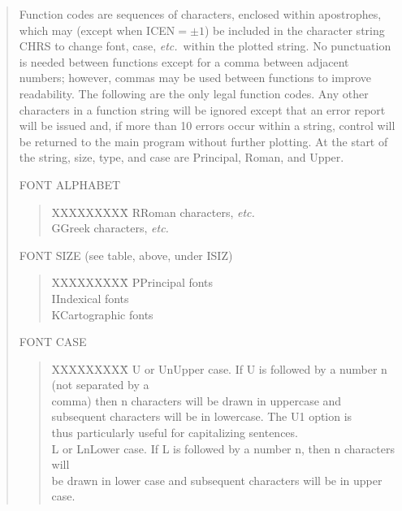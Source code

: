 \documentclass[11pt]{article}
\renewcommand{\_}{{\tt\char'137}}     %
\begin{document}
\begin{quote}
Function codes are sequences of characters, enclosed within
apostrophes, which may (except when ICEN$=\pm1$) be included in the
character string CHRS to change font, case, {\em etc.}\ within the plotted
string.
No punctuation is needed between functions except for a
comma between adjacent numbers;  however, commas may be used between
functions to improve readability.
The following are the only legal
function codes.
Any other characters in a function string will be
ignored except that an error report will be issued and, if more
than 10 errors occur within a string, control will be returned to
the main program without further plotting.
At the start of the
string, size, type, and case are Principal, Roman, and Upper.

FONT ALPHABET

\begin{quote}
\begin{tabbing}
XXXXXXXXX\=\kill
R\>Roman characters, {\em etc.}\\
G\>Greek characters, {\em etc.}
\end{tabbing}
\end{quote}

FONT SIZE (see table, above, under ISIZ)

\begin{quote}
\begin{tabbing}
XXXXXXXXX\=\kill
P\>Principal fonts\\
I\>Indexical fonts\\
K\>Cartographic fonts
\end{tabbing}
\end{quote}

FONT CASE

\begin{quote}
\begin{tabbing}
XXXXXXXXX\=\kill
U or Un\>Upper case.  If U is followed by a number n (not separated by a\\
\>comma) then n characters will be drawn in uppercase and\\
\>subsequent characters will be in lowercase.  The U1 option is\\
\>thus particularly useful for capitalizing sentences.\\
L or Ln\>Lower case.  If L is followed by a number n, then n characters will\\
\>be drawn in lower case and subsequent characters will be in upper\\
\>case.
\end{tabbing}
\end{quote}


\end{quote}
\end{document}
